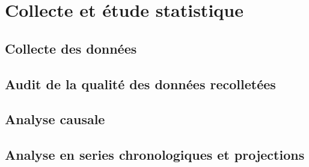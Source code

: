 \chapter{Collecte et étude statistique}
	\section{Collecte des données}
	\section{Audit de la qualité des données recolletées}
	\section{Analyse causale}
	\section{Analyse en series chronologiques et projections}